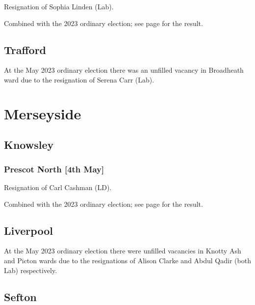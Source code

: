 \documentclass[a4paper,openany]{book}
\begin{document}
\begin{resultsiii}
Resignation of Sophia Linden (Lab).

Combined with the 2023 ordinary election; see page \pageref{PendleburyCliftonSalford} for the result.

\subsection*{Trafford}

At the May 2023 ordinary election there was an unfilled vacancy in Broadheath ward due to the resignation of Serena Carr (Lab).%

\section{Merseyside}

\subsection*{Knowsley}

\subsubsection*{Prescot North \hspace*{\fill}\nolinebreak[1]%
	\enspace\hspace*{\fill}
	[4th May]}


Resignation of Carl Cashman (LD).

Combined with the 2023 ordinary election; see page \pageref{KnowsleyPrescotNorth} for the result.

\subsection*{Liverpool}

At the May 2023 ordinary election there were unfilled vacancies in Knotty Ash and Picton wards due to the resignations of Alison Clarke and Abdul Qadir (both Lab) respectively.%
%

\subsection*{Sefton}


\end{resultsiii}
\end{document}
